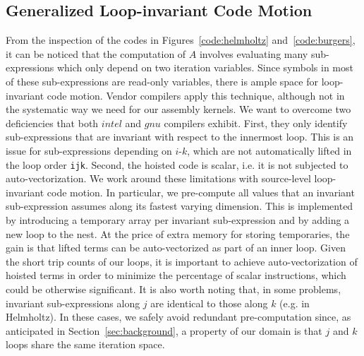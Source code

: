 \documentclass[conference]{IEEEtran}
\begin{document}
\subsection{Generalized Loop-invariant Code Motion}
\label{sec:code-transf-licm}
From the inspection of the codes in Figures~\ref{code:helmholtz} and~\ref{code:burgers}, it can be noticed that the computation of $A$ involves evaluating many sub-expressions which only depend on two iteration variables. Since symbols in most of these sub-expressions are read-only variables, there is ample space for loop-invariant code motion. Vendor compilers apply this technique, although not in the systematic way we need for our assembly kernels. We want to overcome two deficiencies that both $intel$ and $gnu$ compilers exhibit. First, they only identify sub-expressions that are invariant with respect to the innermost loop. This is an issue for sub-expressions depending on $i$-$k$, which are not automatically lifted in the loop order \texttt{ijk}. Second, the hoisted code is scalar, i.e. it is not subjected to auto-vectorization. We work around these limitations with source-level loop-invariant code motion. In particular, we pre-compute all values that an invariant sub-expression assumes along its fastest varying dimension. This is implemented by introducing a temporary array per invariant sub-expression and by adding a new loop to the nest. At the price of extra memory for storing temporaries, the gain is that lifted terms can be auto-vectorized as part of an inner loop. Given the short trip counts of our loops, it is important to achieve auto-vectorization of hoisted terms in order to minimize the percentage of scalar instructions, which could be otherwise significant. It is also worth noting that, in some problems, invariant sub-expressions along $j$ are identical to those along $k$ (e.g. in Helmholtz). In these cases, we safely avoid redundant pre-computation since, as anticipated in Section~\ref{sec:background}, a property of our domain is that $j$ and $k$ loops share the same iteration space.
\end{document}
